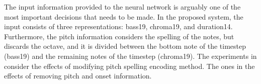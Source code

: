 
The input information provided to the neural network is
arguably one of the most important decisions that needs to
be made. In the proposed system, the input consists of three
representations: \gls{bass19}, \gls{chroma19}, and
\gls{duration14}. Furthermore, the pitch information
considers the spelling of the notes, but discards the
octave, and it is divided between the bottom note of the
timestep (\gls{bass19}) and the remaining notes of the
timestep (\gls{chroma19}). The experiments in
 consider the
effects of modifying pitch spelling encoding method. The
ones in  the effects of
removing pitch and onset information.
